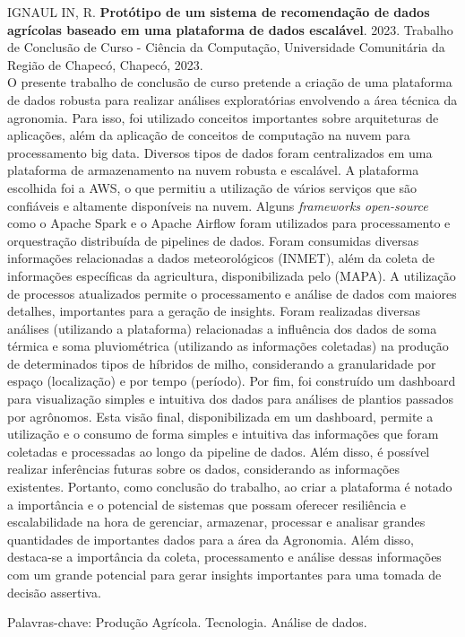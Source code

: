 \setlength{\absparsep}{18pt} %
\begin{resumo}
\noindent IGNAUL
IN, R.  \textbf{Protótipo de um sistema de recomendação de dados agrícolas baseado em uma plataforma de dados escalável}. 2023. Trabalho de Conclusão de Curso - Ciência da Computação, Universidade Comunitária da Região de Chapecó, Chapecó, 2023.\\


\noindent  O presente trabalho de conclusão de curso pretende a criação de uma plataforma de dados robusta para realizar análises exploratórias envolvendo a área técnica da agronomia. Para isso, foi utilizado conceitos importantes sobre arquiteturas de aplicações, além da aplicação de conceitos de computação na nuvem para processamento big data. Diversos tipos de dados foram centralizados em uma plataforma de armazenamento na nuvem robusta e escalável. A plataforma escolhida foi a AWS, o que permitiu a utilização de vários serviços que são confiáveis e altamente disponíveis na nuvem. Alguns \textit{frameworks open-source} como o Apache Spark e o Apache Airflow foram utilizados para processamento e orquestração distribuída de pipelines de dados. Foram consumidas diversas informações relacionadas a dados meteorológicos (INMET), além da coleta de informações específicas da agricultura, disponibilizada pelo (MAPA). A utilização de processos atualizados permite o processamento e análise de dados com maiores detalhes, importantes para a geração de insights. Foram realizadas diversas análises (utilizando a plataforma) relacionadas a influência dos dados de soma térmica e soma pluviométrica (utilizando as informações coletadas) na produção de determinados tipos de híbridos de milho, considerando a granularidade por espaço (localização) e por tempo (período). Por fim, foi construído um dashboard para visualização simples e intuitiva dos dados para análises de plantios passados por agrônomos.  Esta visão final, disponibilizada em um dashboard, permite a utilização e o consumo de forma simples e intuitiva das informações que foram coletadas e processadas ao longo da pipeline de dados. Além disso, é possível realizar inferências futuras sobre os dados, considerando as informações existentes. Portanto, como conclusão do trabalho, ao criar a plataforma é notado a importância e o potencial de sistemas que possam oferecer resiliência e escalabilidade na hora de gerenciar, armazenar, processar e analisar grandes quantidades de importantes dados para a área da Agronomia. Além disso, destaca-se a importância da coleta, processamento e análise dessas informações com um grande potencial para gerar insights importantes para uma tomada de decisão assertiva. 

\noindent Palavras-chave: Produção Agrícola. Tecnologia. Análise de dados.
\end{resumo}